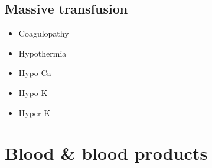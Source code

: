 \documentclass[
  12pt,
]{memoir}
\providecommand{\tightlist}{%
  \setlength{\itemsep}{0pt}\setlength{\parskip}{0pt}}
\begin{document}
\hypertarget{massive-transfusion}{%
\subsection{Massive transfusion}\label{massive-transfusion}}

\begin{itemize}
\tightlist
\item
  Coagulopathy
\item
  Hypothermia
\item
  Hypo-Ca
\item
  Hypo-K
\item
  Hyper-K
\end{itemize}

\hypertarget{blood-blood-products}{%
\section{Blood \& blood products}\label{blood-blood-products}}
\end{document}
